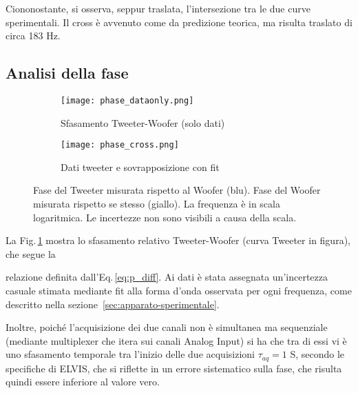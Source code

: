 \documentclass[../Relazione_circuiti]{subfiles}
\begin{document}
  Ciononostante, si osserva, seppur traslata, l'intersezione tra le due curve sperimentali. Il cross è avvenuto come da predizione teorica, ma risulta traslato di circa 183 Hz.
  
 

\subsection{Analisi della fase}

  \begin{figure}[H]
    \centering

    \begin{subfigure}{=0.49\textwidth}
      \centering
      \texttt{[image: phase\_dataonly.png]}
      \caption{Sfasamento Tweeter-Woofer (solo dati)}
      \label{fig:pdiff_dataonly}

    \end{subfigure}
    \hfill
    \begin{subfigure}{=0.49\textwidth}
      \centering
      \texttt{[image: phase\_cross.png]}
      \caption{Dati tweeter e sovrapposizione con fit}
      \label{fig:pdiff_fit_data}

    \end{subfigure}

    \caption{
      Fase del Tweeter misurata rispetto al Woofer (blu). Fase del Woofer misurata rispetto se stesso (giallo).
      La frequenza è in scala logaritmica. Le incertezze non sono visibili a causa della scala.
    }
    \label{fig:phase_diff}

  \end{figure}

  La Fig.\,\ref{fig:pdiff_dataonly} mostra lo sfasamento relativo Tweeter-Woofer (curva Tweeter in figura), che segue la

  relazione definita dall'Eq.\,\eqref{eq:p_diff}.
  Ai dati è stata assegnata un'incertezza casuale stimata mediante fit alla forma d'onda osservata per ogni frequenza,
  come descritto nella sezione~\ref{sec:apparato-sperimentale}.

  Inoltre, poiché l'acquisizione dei due canali non è simultanea ma sequenziale (mediante multiplexer che itera sui
  canali Analog Input) si ha che tra di essi vi è uno sfasamento temporale tra l'inizio delle due acquisizioni
  $\tau_{aq}=1$ \textmu S, secondo le specifiche di ELVIS, che si riflette in un errore
  sistematico sulla fase, che risulta quindi essere inferiore al valore vero.
\end{document}
